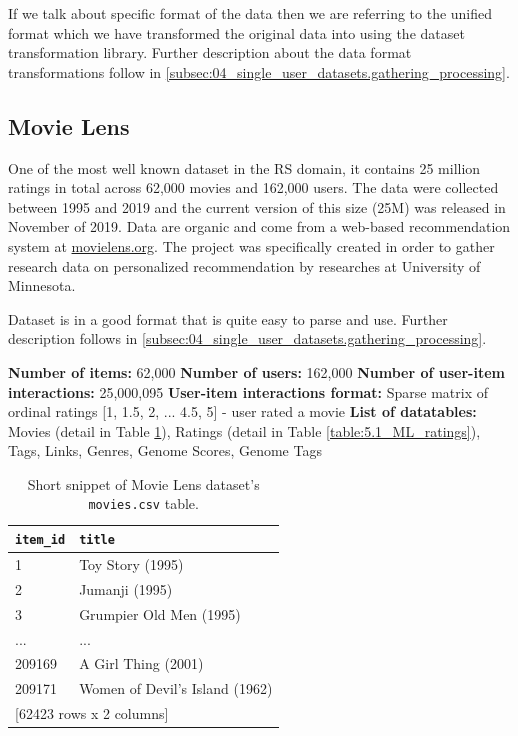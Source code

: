 If we talk about specific format of the data then we are referring to the unified format which we have transformed the original data into using the dataset transformation library. Further description about the data format transformations follow in \ref{subsec:04_single_user_datasets.gathering_processing}.



\subsection{Movie Lens}
One of the most well known dataset in the RS domain, it contains 25 million ratings in total across 62,000 movies and 162,000 users. The data were collected between 1995 and 2019 and the current version of this size (25M) was released in November of 2019. Data are organic and come from a web-based recommendation system at \href{https://movielens.org/}{movielens.org}. The project was specifically created in order to gather research data on personalized recommendation by researches at University of Minnesota.

Dataset is in a good format that is quite easy to parse and use. Further description follows in \ref{subsec:04_single_user_datasets.gathering_processing}.

\hfill \break
\noindent
\textbf{Number of items:} 62,000 \newline
\textbf{Number of users:} 162,000 \newline
\textbf{Number of user-item interactions:} 25,000,095 \newline
\textbf{User-item interactions format:} Sparse matrix of ordinal ratings [1, 1.5, 2, ... 4.5, 5] - user rated a movie \newline
\textbf{List of datatables:} Movies (detail in Table \ref{table:5.1_ML_movies}), Ratings (detail in Table \ref{table:5.1_ML_ratings}), Tags, Links, Genres, Genome Scores, Genome Tags

\begin{table}[ht!]
\centering
\begin{tabular}{ l l }
\verb|item_id| & \verb|title| \\
    \hline
     1  &                   Toy Story (1995) \\
     2  &                     Jumanji (1995) \\
     3  &            Grumpier Old Men (1995) \\
   ...  &                                ... \\
209169  &                A Girl Thing (2001) \\
209171  &     Women of Devil's Island (1962) \\ [1mm]
\multicolumn{2}{l}{{[62423 rows x 2 columns]}}
\end{tabular}
\caption{Short snippet of Movie Lens dataset's \texttt{movies.csv} table.}
\label{table:5.1_ML_movies}
\end{table}


